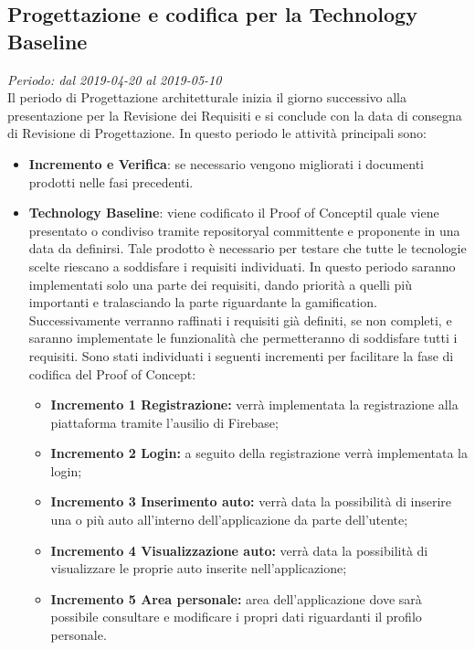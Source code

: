 \subsection{Progettazione e codifica per la Technology Baseline}
\textit{Periodo: dal 2019-04-20 al 2019-05-10} \\
Il periodo di Progettazione architetturale inizia il giorno successivo alla presentazione per la Revisione dei Requisiti e si conclude con la data di consegna di Revisione di 
Progettazione. In questo periodo le attività principali sono:
\begin{itemize}
	\item \textbf{Incremento e Verifica}: se necessario vengono migliorati i 
	documenti prodotti nelle fasi precedenti.
	\item \textbf{Technology Baseline\glo}: viene codificato il Proof of Concept\glosp il quale viene presentato o condiviso tramite repository\glosp al committente e proponente in una data da definirsi. Tale prodotto è necessario per testare che tutte le tecnologie scelte riescano a soddisfare i requisiti individuati. In questo periodo saranno implementati solo una parte dei requisiti, dando priorità a quelli più importanti e tralasciando la parte riguardante la gamification\glo. Successivamente verranno raffinati i requisiti già definiti, se non completi, e saranno implementate le funzionalità che permetteranno di soddisfare tutti i requisiti.
	Sono stati individuati i seguenti incrementi per facilitare la fase di codifica del Proof of Concept\glo:
	\begin{itemize}
		\item \textbf{Incremento 1 Registrazione:} verrà implementata la registrazione alla piattaforma tramite l'ausilio di Firebase\glo;
		\item \textbf{Incremento 2 Login:} a seguito della registrazione verrà implementata la login;
		\item \textbf{Incremento 3 Inserimento auto:} verrà data la possibilità di inserire una o più auto all'interno dell'applicazione da parte dell'utente;
		\item \textbf{Incremento 4 Visualizzazione auto:} verrà data la possibilità di visualizzare le proprie auto inserite nell'applicazione;
		\item \textbf{Incremento 5 Area personale:} area dell'applicazione dove sarà possibile consultare e modificare i propri dati riguardanti il profilo personale.
		
		
	\end{itemize}
		
\end{itemize}

